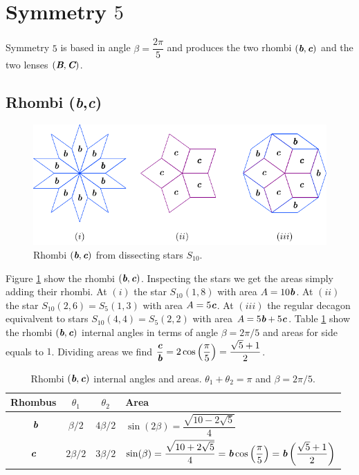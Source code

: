 \documentclass[11pt]{article}
\def\mathbi#1{\textbf{\em #1}}
\begin{document}
\section{Symmetry $5$}

Symmetry $5$ is based in angle $\beta = \dfrac{2\pi}5$ and produces the two rhombi $(\mathbi{b},\mathbi{c})$ and the two lenses $(\mathbi{B},\mathbi{C})$.

\subsection{Rhombi (\mathbi{b},\mathbi{c})}

\begin{figure}[H]
\centering
\includegraphics[scale=1.1]{bc/rhombi}
\caption{Rhombi $(\mathbi{b},\mathbi{c})$ from dissecting stars $S_{10}$.}
\label{fig:bc-rhombi}
\end{figure}

Figure \ref{fig:bc-rhombi} show the rhombi $(\mathbi{b},\mathbi{c})$. 
Inspecting the stars we get the areas simply adding their rhombi.
At $(i)$ the star $S_{10}(1,8)$ with area $A = 10\mathbi{b}$.
At $(ii)$ the star $S_{10}(2,6) = S_5(1,3)$ with area $A = 5\mathbi{c}$.
At $(iii)$ the regular decagon equivalvent to stars $S_{10}(4,4) = S_5(2,2)$ with area $A = 5\mathbi{b} + 5\mathbi{c}$. 
Table \ref {tbl:bc-angles} show the rhombi $(\mathbi{b},\mathbi{c})$ internal angles in terms of angle $\beta = 2\pi/5$ and areas for side equals to $1$. Dividing areas we find $\dfrac{\mathbi{c}}{\mathbi{b}} = 2\cos\left(\dfrac{\pi}5\right) = \dfrac{\sqrt5 + 1}2$.

\begin{table}[H]
\begin{center}
\begin{tabular}{|c|c c| l |}
\hline
Rhombus & $\theta_1$ & $\theta_2$ & Area \\ \hline\
$\mathbi{b}$ & $\beta/2$ & $4\beta/2$ & $\sin(2\beta) = \dfrac{\sqrt{10-2\sqrt5}}4 $
\\[1.2ex] \hline
$\mathbi{c}$ & $2\beta/2$ & $3\beta/2$ & 
$\sin(\beta) = \dfrac{\sqrt{10+2\sqrt5}}4 
= \mathbi{b}\cos\left(\dfrac{\pi}5\right) = \mathbi{b}\left(\dfrac{\sqrt5+1}2\right)$
\\[1.2ex] \hline
\end{tabular}
\caption{Rhombi $(\mathbi{b},\mathbi{c})$ internal angles and areas. $\theta_1 + \theta_2 = \pi$ and $\beta = 2\pi/5$.} 
\label{tbl:bc-angles}
\end{center}
\end{table}
\end{document}
